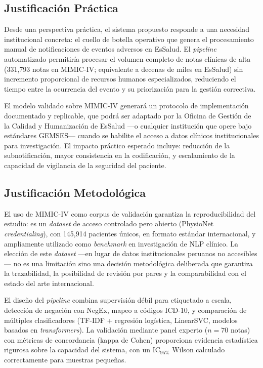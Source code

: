 \subsection{Justificación Práctica}
\label{subsec:justif_practica}

Desde una perspectiva práctica, el sistema propuesto responde a una necesidad institucional concreta: el cuello de botella operativo que genera el procesamiento manual de notificaciones de eventos adversos en EsSalud. El \textit{pipeline} automatizado permitiría procesar el volumen completo de notas clínicas de alta (331{,}793 notas en MIMIC-IV; equivalente a decenas de miles en EsSalud) sin incremento proporcional de recursos humanos especializados, reduciendo el tiempo entre la ocurrencia del evento y su priorización para la gestión correctiva.

El modelo validado sobre MIMIC-IV generará un protocolo de implementación documentado y replicable, que podrá ser adaptado por la Oficina de Gestión de la Calidad y Humanización de EsSalud ---o cualquier institución que opere bajo estándares GEMSES--- cuando se habilite el acceso a datos clínicos institucionales para investigación. El impacto práctico esperado incluye: reducción de la subnotificación, mayor consistencia en la codificación, y escalamiento de la capacidad de vigilancia de la seguridad del paciente.

\subsection{Justificación Metodológica}
\label{subsec:justif_metodologica}

El uso de MIMIC-IV como corpus de validación garantiza la reproducibilidad del estudio: es un \textit{dataset} de acceso controlado pero abierto (PhysioNet \textit{credentialing}), con 145{,}914 pacientes únicos, en formato estándar internacional, y ampliamente utilizado como \textit{benchmark} en investigación de NLP clínico. La elección de este \textit{dataset} ---en lugar de datos institucionales peruanos no accesibles--- no es una limitación sino una decisión metodológica deliberada que garantiza la trazabilidad, la posibilidad de revisión por pares y la comparabilidad con el estado del arte internacional.

El diseño del \textit{pipeline} combina supervisión débil para etiquetado a escala, detección de negación con NegEx, mapeo a códigos ICD-10, y comparación de múltiples clasificadores (TF-IDF + regresión logística, LinearSVC, modelos basados en \textit{transformers}). La validación mediante panel experto ($n = 70$ notas) con métricas de concordancia (kappa de Cohen) proporciona evidencia estadística rigurosa sobre la capacidad del sistema, con un IC$_{95\%}$ Wilson calculado correctamente para muestras pequeñas.

